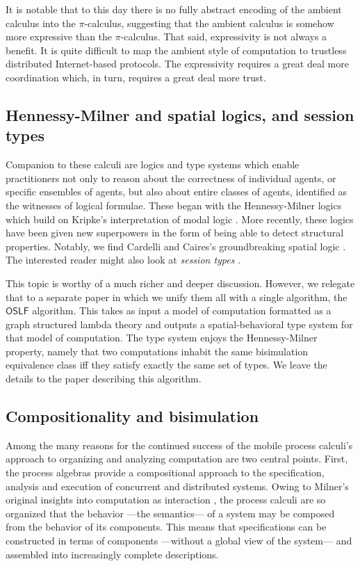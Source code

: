 It is notable that to this day there is no fully abstract encoding of
the ambient calculus into the $\pi$-calculus, suggesting that the
ambient calculus is somehow more expressive than the
$\pi$-calculus. That said, expressivity is not always a benefit. It is
quite difficult to map the ambient style of computation to trustless
distributed Internet-based protocols. The expressivity requires a
great deal more coordination which, in turn, requires a great deal
more trust.

\subsection{Hennessy-Milner and spatial logics, and session types}

Companion to these calculi are logics and type systems which enable
practitioners not only to reason about the correctness of individual
agents, or specific ensembles of agents, but also about entire classes
of agents, identified as the witnesses of logical formulae. These
began with the Hennessy-Milner logics which build on Kripke's
interpretation of modal logic \cite{milner91polyadicpi}. More
recently, these logics have been given new superpowers in the form of
being able to detect structural properties. Notably, we find Cardelli
and Caires's groundbreaking spatial logic
\cite{DBLP:conf/fossacs/Caires04} \cite{DBLP:journals/iandc/CairesC03}
\cite{DBLP:journals/tcs/CairesC04}. The interested reader might also
look at \emph{session types}
\cite{DBLP:conf/wsfm/Dezani-Ciancaglinid09}.

This topic is worthy of a much richer and deeper discussion. However,
we relegate that to a separate paper in which we unify them all with a
single algorithm, the $\mathsf{OSLF}$ algorithm. This takes as input a
model of computation formatted as a graph structured lambda theory and
outputs a spatial-behavioral type system for that model of
computation. The type system enjoys the Hennessy-Milner property,
namely that two computations inhabit the same bisimulation equivalence
class iff they satisfy exactly the same set of types. We leave the
details to the paper describing this algorithm.

\subsection{Compositionality and bisimulation}
Among the many reasons for the continued success of the mobile process
calculi's approach to organizing and analyzing computation are two
central points. First, the process algebras provide a compositional
approach to the specification, analysis and execution of concurrent
and distributed systems. Owing to Milner's original insights into
computation as interaction \cite{DBLP:journals/cacm/Milner93}, the
process calculi are so organized that the behavior ---the semantics---
of a system may be composed from the behavior of its components. This
means that specifications can be constructed in terms of components
---without a global view of the system--- and assembled into
increasingly complete descriptions.

